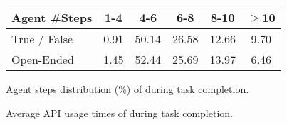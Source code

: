 


\begin{minipage}{\textwidth}
\begin{minipage}[b]{0.48\textwidth}
\makeatletter{}
\centering
\resizebox{0.84\linewidth}{!}
{
\begin{tabular}{lccccc}
\toprule
Agent \#Steps          & 1-4   & 4-6   & 6-8   & 8-10 & $\ge$10  \\
\midrule
True / False     & 0.91 &	50.14	& 26.58 &	12.66 &	9.70 \\
Open-Ended & 1.45 &	52.44 &	25.69 &	13.97 &	6.46\\
\bottomrule
\end{tabular}
}
\vspace{-2mm}
\caption{Agent steps distribution (\%) of \modelname during task completion.}
\label{table agent steps}
\vspace{-2mm}

\end{minipage}
\hspace{0.3cm}
\begin{minipage}[b]{0.48\textwidth}
\makeatletter{}
\centering
{}
\vspace{-2mm}
\caption{Average API usage times of \modelname during task completion.}
\label{table API usage}
\vspace{-2mm}
\end{minipage}
\end{minipage}




